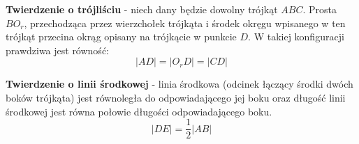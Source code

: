 \documentclass[14pt,a4paper]{extarticle}
\begin{document}
\hfill\break
\noindent \textbf{Twierdzenie o trójliściu} - niech dany będzie dowolny trójkąt $ABC$. Prosta $BO_{r}$,
przechodząca przez wierzchołek trójkąta i środek okręgu wpisanego w ten trójkąt przecina okrąg 
opisany na trójkącie w punkcie $D$. W takiej konfiguracji prawdziwa jest równość:
$$\vert AD\vert = \vert O_{r}D\vert = \vert CD \vert$$

\newpage
\MoveBelowBox\unskip
\hfill\break

\hfill\break
\noindent \textbf{Twierdzenie o linii środkowej} - linia środkowa (odcinek łączący środki
dwóch boków trójkąta) jest równoległa do odpowiadającego
jej boku oraz długość linii środkowej jest równa połowie długości odpowiadającego boku.
$$\vert DE\vert = \dfrac{1}{2}\vert AB\vert$$
\hfill\break
\end{document}
